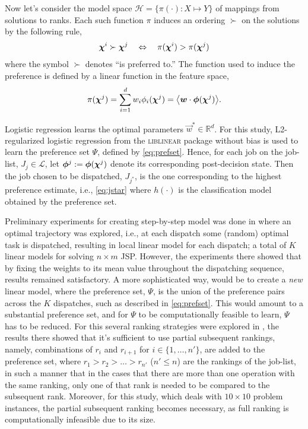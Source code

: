 \documentclass[smallextended]{svjour3}
\begin{document}
Now let's consider the model space $\mathcal{H} = \{\pi(\cdot) : X \mapsto Y\}$ 
of mappings from solutions to ranks. Each such 
function $\pi$ induces an ordering $\succ$ on the solutions  by the following 
rule,
\begin{equation}\label{eq:linear}
\bm \chi^i \succ \bm \chi^j \quad \Leftrightarrow \quad \pi(\bm \chi^i) > 
\pi(\bm \chi^j)
\end{equation}
where the symbol $\succ$ denotes ``is preferred to.''  The function used to 
induce the preference is defined by a linear function in the feature space,
\begin{equation} 
\pi(\vchi^j)=\sum_{i=1}^d w_i\phi_i(\vchi^j)=\inner{\vec{w}}{\vphi(\vchi^j)}.
\end{equation}

Logistic regression learns the optimal parameters $\vec{w}^*\in\mathbb{R}^d$. 
For this study, L2-regularized logistic regression from the \textsc{liblinear} 
package \cite{liblinear} without bias is used to learn the preference set 
$\Psi$, defined by \cref{eq:prefset}.
Hence, for each job on the job-list, $J_j\in\mathcal{L}$, let 
$\bm{\phi}^j:=\bm{\phi}(\bm \chi^j)$ denote its corresponding  post-decision state. 
Then the job chosen to be dispatched, $J_{j^*}$, is the one corresponding to 
the highest preference estimate, i.e., \cref{eq:jstar} where $h(\cdot)$ is the 
classification model obtained by the preference set.

Preliminary experiments for creating step-by-step model was done in 
\cite{InRu11a} where an optimal trajectory was explored, i.e., at each dispatch 
some (random) optimal task is dispatched, resulting in local linear model for 
each dispatch; a total of $K$ linear models for solving $n\times m$ JSP. 
However, the experiments there showed that by fixing the weights to its mean 
value throughout the dispatching sequence, results remained satisfactory.
A more sophisticated way, would be to create a \emph{new} linear model, where 
the preference set, $\Psi$, is the union of the preference pairs across the 
$K$ dispatches, such as described in \cref{eq:prefset}. 
This would amount to a substantial preference set, and for $\Psi$ to be 
computationally feasible to learn, $\Psi$ has to be reduced. For this several 
ranking strategies were explored in \cite{InRu15a}, the results there showed 
that it's sufficient to use partial subsequent rankings, namely, combinations 
of $r_i$ and $r_{i+1}$ for $i\in\{1,\ldots,n'\}$, are added to the preference 
set, where $r_1>r_2>\ldots>r_{n'}$ ($n'\leq n$) are the rankings of the 
job-list, in such a manner that in the cases that there are more than one 
operation with the same ranking, only one of that rank is needed to be compared 
to the subsequent rank. 
Moreover, for this study, which deals with $10\times 10$ problem instances, 
the partial subsequent ranking becomes necessary, as full ranking is 
computationally infeasible due to its size. 
\end{document}
